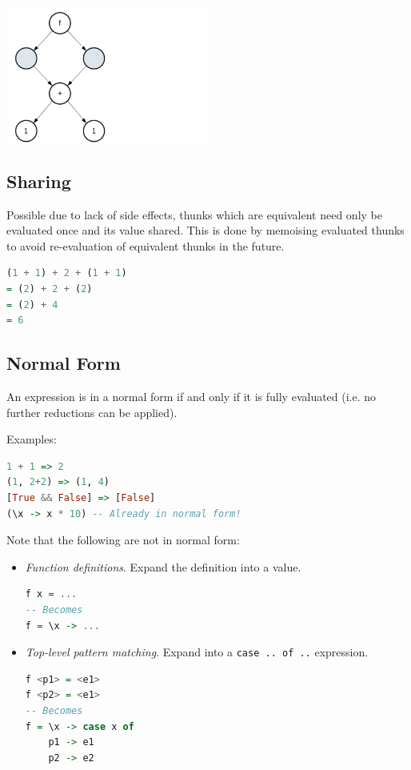 \medskip
\includegraphics[width=0.5\textwidth]{latex/assets/graph-reduction-sharing.png}

\subsection{Sharing}
Possible due to lack of side effects, thunks which are equivalent need only be evaluated once and its value shared.
This is done by memoising evaluated thunks to avoid re-evaluation of equivalent thunks in the future.

\begin{lstlisting}[language=haskell]
(1 + 1) + 2 + (1 + 1)
= (2) + 2 + (2)
= (2) + 4
= 6
\end{lstlisting}

\subsection{Normal Form}
An expression is in a normal form if and only if it is fully evaluated (i.e. no further reductions can be applied).

Examples:
\begin{lstlisting}[language=haskell]
1 + 1 => 2
(1, 2+2) => (1, 4)
[True && False] => [False]
(\x -> x * 10) -- Already in normal form!
\end{lstlisting}

Note that the following are not in normal form:
\begin{itemize}
  \item \textit{Function definitions}. Expand the definition into a value.
  \begin{lstlisting}[language=haskell]
f x = ...
-- Becomes
f = \x -> ...\end{lstlisting}
  \item \textit{Top-level pattern matching}. Expand into a \texttt{case .. of ..} expression.
  \begin{lstlisting}[language=haskell]
f <p1> = <e1>
f <p2> = <e1>
-- Becomes
f = \x -> case x of
    p1 -> e1
    p2 -> e2
\end{lstlisting}
\end{itemize}

